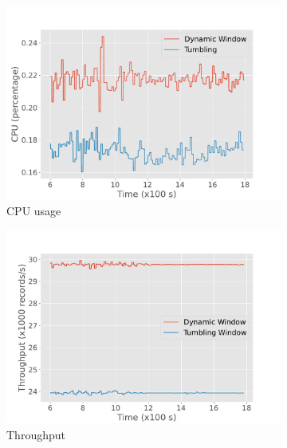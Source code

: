 \begin{figure}
    \begin{subfigure}[b]{0.5\columnwidth}
        \includegraphics[width=\columnwidth]{fig/periodic/cpu_comparison.pdf}
        \caption{CPU usage}
        \label{fig:periodic_cpu}
    \end{subfigure}
    \hfill 
    \begin{subfigure}[b]{0.5\columnwidth}
        \includegraphics[width=\columnwidth]{fig/periodic/throughput_comparison.pdf}
        \caption{Throughput }
        \label{fig:periodic_throughput}
    \end{subfigure}
    \begin{subfigure}[b]{0.5\columnwidth}

\end{subfigure}
\end{figure}
